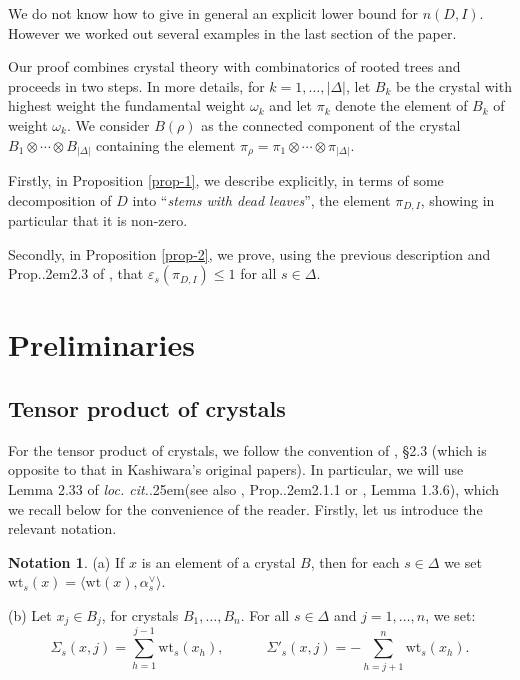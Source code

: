 \documentclass[12pt]{amsart}
\numberwithin{equation}{section}
\theoremstyle{definition}
\newtheorem{nota}[thm]{Notation}
\def\Prop{Prop.\kern.2em}
\def\loccit{\textit{loc.\kern2pt cit.}\kern.25em}
\def\wt{\mathrm{wt}}  %
\let\vep\varepsilon
\begin{document}
We do not know how  to give in general an explicit lower bound for $n(D,I)$. However we worked out several  examples in the last section of the paper. 



Our proof combines crystal theory with combinatorics of rooted trees and proceeds in two steps. 
In more details, for $k = 1,\dots, \vert \Delta\vert$, let $B_k$ be the crystal with 
highest weight the fundamental weight $\omega_k$ and let $\pi_k$ denote the element of $B_k$ of weight 
$\omega_k$. We consider $B(\rho)$ as the connected component of 
the crystal 
$B_1\otimes \cdots \otimes B_{\vert \Delta\vert}$ containing the element $\pi_\rho = 
 \pi_1 \otimes \cdots \otimes \pi_{\vert \Delta\vert}$. 

Firstly, in Proposition \ref{prop-1}, 
we describe explicitly,  in terms of some decomposition of $D$ into 
``\emph{stems with dead leaves}'', the element $\pi_{D, I}$, showing in particular that it 
 is non-zero. 
 
Secondly, in Proposition \ref{prop-2}, we prove, 
using the previous description and \Prop 2.3 of \cite{BG25}, 
 that $\vep_s(\pi_{D, I}) \leq 1$ for all $s\in \Delta$. 


\section{Preliminaries} 

\subsection{Tensor product of crystals} 
For the tensor product of crystals, we follow the convention of \cite{BS17}, \S 2.3 (which is opposite to that in 
Kashiwara's original papers). In particular, we will use Lemma 2.33 of \loccit (see also \cite{KN94}, \Prop 2.1.1 or 
\cite{Ka93}, Lemma 1.3.6), 
which we recall below for the 
convenience of the reader. Firstly, let us introduce the relevant notation. 

\begin{nota} (a) If $x$ is an element of a crystal $B$, then for each $s\in \Delta$ we set $\wt_s(x) = 
 \langle \wt(x), \alpha_s^\vee \rangle$. 
 
\smallskip (b) Let $x_j \in B_j$, for crystals $B_1, \dots, B_n$. 
For all $s\in \Delta$ and $j = 1,\dots,n$, we set: 
\begin{equation} 
\Sigma_s(x,j) = \sum_{h=1}^{j-1} \wt_s(x_h), \qquad \quad 
\Sigma'_s(x,j) = -\sum_{h=j+1}^{n} \wt_s(x_h). 
\end{equation} 
\end{nota} 
\end{document}
